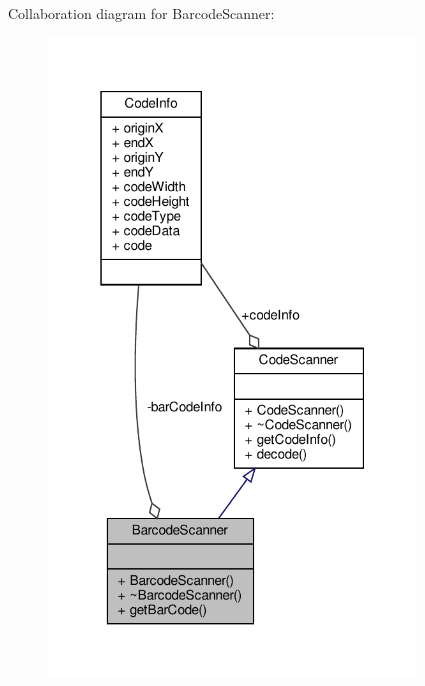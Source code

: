Collaboration diagram for Barcode\+Scanner\+:\nopagebreak
\begin{figure}[H]
\begin{center}
\leavevmode
\includegraphics[width=277pt]{class_barcode_scanner__coll__graph}
\end{center}
\end{figure}
